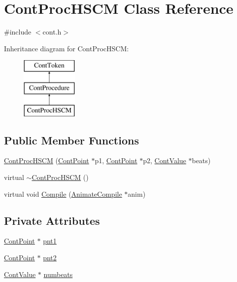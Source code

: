\hypertarget{a00074}{\section{Cont\-Proc\-H\-S\-C\-M Class Reference}
\label{a00074}
}


{\ttfamily \#include $<$cont.\-h$>$}

Inheritance diagram for Cont\-Proc\-H\-S\-C\-M\-:\begin{figure}[H]
\begin{center}
\leavevmode
\includegraphics[height=3.000000cm]{a00074}
\end{center}
\end{figure}
\subsection*{Public Member Functions}
\begin{DoxyCompactItemize}
\item 
\hyperlink{a00074_ab1a1fff473459b00479d7bb6d8b5bb39}{Cont\-Proc\-H\-S\-C\-M} (\hyperlink{a00062}{Cont\-Point} $\ast$p1, \hyperlink{a00062}{Cont\-Point} $\ast$p2, \hyperlink{a00086}{Cont\-Value} $\ast$beats)
\item 
virtual \hyperlink{a00074_a29071a895ef2d2ceab3f7298347dfee3}{$\sim$\-Cont\-Proc\-H\-S\-C\-M} ()
\item 
virtual void \hyperlink{a00074_ac601399766720bd99b7124dce80e91cf}{Compile} (\hyperlink{a00007}{Animate\-Compile} $\ast$anim)
\end{DoxyCompactItemize}
\subsection*{Private Attributes}
\begin{DoxyCompactItemize}
\item 
\hyperlink{a00062}{Cont\-Point} $\ast$ \hyperlink{a00074_a2c03ec4f314bf138cdc2f7d18ed149e5}{pnt1}
\item 
\hyperlink{a00062}{Cont\-Point} $\ast$ \hyperlink{a00074_a5115344853ea43df21bc79a7997582e2}{pnt2}
\item 
\hyperlink{a00086}{Cont\-Value} $\ast$ \hyperlink{a00074_af7b7dbcb36f1ea7674e6cf724e4b01a4}{numbeats}
\end{DoxyCompactItemize}
